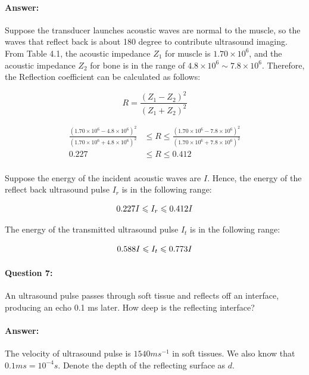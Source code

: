 \documentclass[12pt, letter]{article}
\begin{document}
\paragraph{Answer: }
Suppose the transducer launches acoustic waves are normal to the muscle, so the waves that reflect back is about 180 degree to contribute ultrasound imaging. From Table 4.1, the acoustic impedance $Z_1$ for muscle is $1.70 \times 10^6$, and the acoustic impedance $Z_2$ for bone is in the range of $4.8 \times 10^6 \sim 7.8 \times 10^6$. Therefore, the Reflection coefficient can be calculated as follows:

\begin{equation}
R = \frac{(Z_1 - Z_2)^2}{(Z_1 + Z_2)^2}
\end{equation}

\begin{equation}
\begin{split}
\frac{(1.70 \times 10^6 - 4.8 \times 10^6)^2}{(1.70 \times 10^6 + 4.8 \times 10^6)^2} & \leqslant R \leqslant \frac{(1.70 \times 10^6 - 7.8 \times 10^6)^2}{(1.70 \times 10^6 + 7.8 \times 10^6)^2} \\
0.227 & \leqslant R \leqslant 0.412 \\
\end{split}
\end{equation}

Suppose the energy of the incident acoustic waves are $I$. Hence, the energy of the reflect back ultrasound pulse $I_{r}$ is in the following range:

\begin{equation}
0.227I \leqslant I_{r} \leqslant 0.412I\\
\end{equation}

The energy of the transmitted ultrasound pulse $I_t$ is in the following range:

\begin{equation}
0.588I \leqslant I_{t} \leqslant 0.773I\\
\end{equation}

\paragraph{Question 7: } An ultrasound pulse passes through soft tissue and reflects off an interface, producing an echo 0.1 ms later. How deep is the reflecting interface?

\paragraph{Answer: } The velocity of ultrasound pulse is $1540 ms^{-1}$ in soft tissues. We also know that $0.1ms = 10^{-4}s$. Denote the depth of the reflecting surface as $d$.
\end{document}
